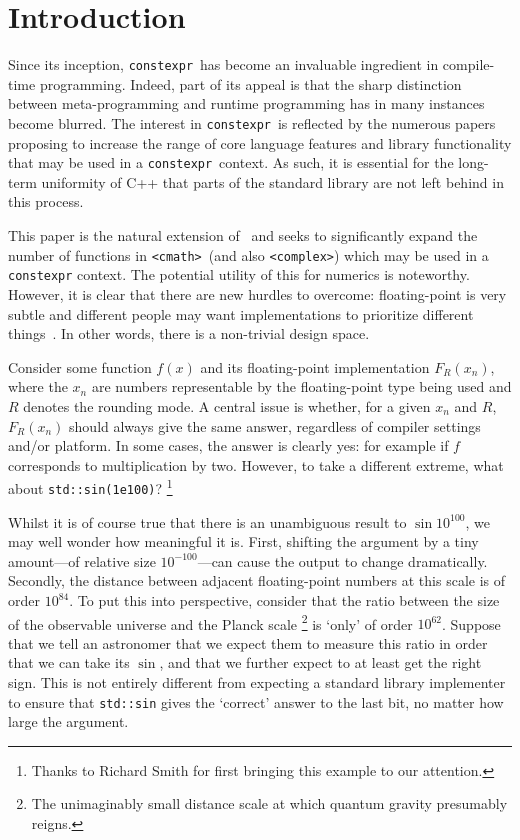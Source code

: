 \documentclass[prd,twocolumn,amsmath,amssymb,nofootinbib,eqsecnum]{revtex4-1}
\newcommand{\constexpr}{\code{constexpr}\xspace}
\newcommand{\code}[1]{{\tt #1}}
\newcommand{\header}[1]{{\tt <#1>}}
\newcommand{\cmath}{\header{cmath}}
\newcommand{\complex}{\header{complex}}
\begin{document}
\section{Introduction}
\label{sec:Intro}

Since its inception, \constexpr\ has become an invaluable ingredient in compile-time programming. Indeed, part of its appeal is that the sharp distinction between meta-programming and runtime programming has in many instances become blurred. The interest in \constexpr\ is reflected by the numerous papers proposing to increase the range of core language features and library functionality that may be used in a \constexpr\ context. As such, it is essential for the long-term uniformity of C++ that parts of the standard library are not left behind in this process.

This paper is the natural extension of~\cite{Rosten-constexpr} and seeks to significantly expand the number of functions in \cmath\ (and also \complex) which may be used in a \constexpr context. The potential utility of this for numerics is noteworthy. However, it is clear that there are new hurdles to overcome: floating-point is very subtle and different people may want implementations to prioritize different things~\cite{Timmons-Less}. In other words, there is a non-trivial design space. 

Consider some function $f(x)$ and its floating-point implementation $F_R(x_n)$, where the $x_n$ are numbers representable by the floating-point type being used and $R$ denotes the rounding mode. A central issue is whether, for a given $x_n$ and $R$, $F_R(x_n)$ should always give the same answer, regardless of compiler settings and/or platform. In some cases, the answer is clearly yes: for example if $f$ corresponds to multiplication by two.  However, to take a different extreme, what about \code{std::sin(1e100)}?%
\footnote{Thanks to Richard Smith for first bringing this example to our attention.}

Whilst it is of course true that there is an unambiguous result to $\sin 10^{100}$, we may well wonder how meaningful it is. First, shifting the argument by a tiny amount---of relative size $10^{-100}$---can cause the output to change dramatically. Secondly, the distance between adjacent floating-point numbers at this scale is of order $10^{84}$. To put this into perspective, consider that the ratio between the size of the observable universe and the Planck scale%
\footnote{The unimaginably small distance scale at which quantum gravity presumably reigns.}
is `only' of order $10^{62}$. Suppose that we tell an astronomer that we expect them to measure this ratio in order that we can take its $\sin$, and that we further expect to at least get the right sign. This is not entirely different from expecting a standard library implementer to ensure that \code{std::sin} gives the `correct' answer to the last bit, no matter how large the argument.
\end{document}
